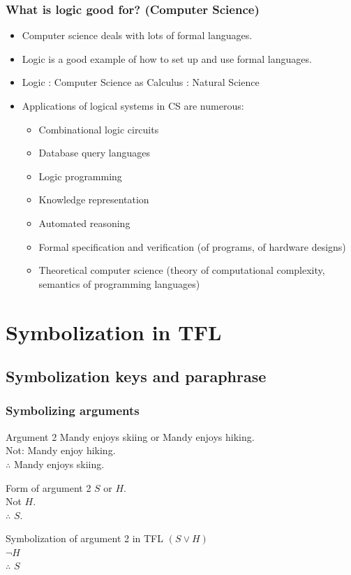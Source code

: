 \begin{frame}
  \frametitle{What is logic good for? (Computer Science)}

  \begin{itemize}[<+->]
    \item Computer science deals with lots of formal languages.
    \item Logic is a good example of how to set up and use formal languages.
    \item Logic : Computer Science as Calculus : Natural Science
    \item Applications of logical systems in CS are numerous:
  \begin{itemize}[<+->]
  \item Combinational logic circuits
  \item Database query languages
  \item Logic programming
  \item Knowledge representation
  \item Automated reasoning
  \item Formal specification and verification (of programs, of hardware designs)
  \item Theoretical computer science (theory of computational
  complexity, semantics of programming languages)
 \end{itemize}
\end{itemize}

\end{frame}

\newhourlecture
\newonlinelecture

\section{Symbolization in TFL}
\subsection{Symbolization keys and paraphrase}

\begin{frame}
  \frametitle{Symbolizing arguments}

  \begin{block}{Argument 2}
    Mandy enjoys skiing or Mandy enjoys hiking.\\
    Not: Mandy enjoy hiking.\\
    $\therefore$ Mandy enjoys skiing.
  \end{block}

  \begin{block}{Form of argument 2}
    $S$ or $H$.\\
    Not $H$.\\
    $\therefore$ $S$.
  \end{block}

  \begin{block}{Symbolization of argument 2 in TFL}
    $(S \lor H)$\\
    $\lnot H$\\
    $\therefore$ $S$
  \end{block}

\end{frame}

